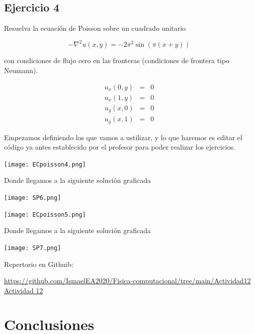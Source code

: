 \documentclass[12pt]{article}
\begin{document}
\subsection*{Ejercicio 4}

Resuelva la ecuación de Poisson sobre un cuadrado unitario 

\begin{equation*}
- \nabla^2 u(x,y)  =  - 2 \pi^2 \sin(\pi (x+y)) 
\end{equation*}

con condiciones de flujo cero en las fronteras (condiciones de frontera tipo Neumann). 

\begin{eqnarray*}
u_x(0,y) & = & 0 \\
u_x(1,y) & = & 0 \\
u_y(x,0) & = & 0 \\
u_y(x,1) & = & 0
\end{eqnarray*}

Empezamos definiendo los que vamos a ustilizar, y lo que haremos es editar el código ya antes establecido por el profesor para poder realizar los ejercicios.

\begin{center}
    \texttt{[image: ECpoisson4.png]}
    
    Donde llegamos a la siguiente solución graficada
    
    \texttt{[image: SP6.png]}
    
    \texttt{[image: ECpoisson5.png]}
    
    Donde llegamos a la siguiente solución graficada
    
    \texttt{[image: SP7.png]}
    
\end{center}

\begin{center}
    Repertorio en Githuib:
    
    \url{https://github.com/IsmaelEA2020/Fisica-computacional/tree/main/Actividad12}
\href{http://www.latex-project.org/}{Actividad 12}

\end{center}



\section{Conclusiones}
\end{document}
